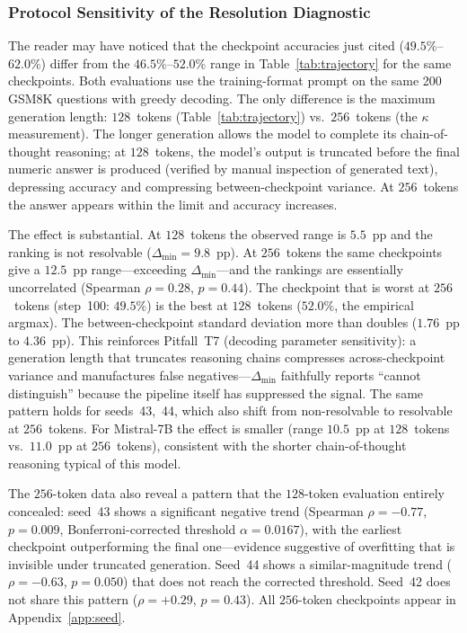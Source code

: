 \documentclass[pdflatex,sn-mathphys-ay,oneside]{sn-jnl}
\theoremstyle{thmstylethree}
\begin{document}
\subsubsection{Protocol Sensitivity of the Resolution Diagnostic}\label{sec:protocol_sensitivity}

The reader may have noticed that the checkpoint accuracies just cited ($49.5\%$--$62.0\%$) differ from the $46.5\%$--$52.0\%$ range in Table~\ref{tab:trajectory} for the same checkpoints. Both evaluations use the training-format prompt on the same 200 GSM8K questions with greedy decoding. The only difference is the maximum generation length: $128$~tokens (Table~\ref{tab:trajectory}) vs.\ $256$~tokens (the $\kappa$ measurement). The longer generation allows the model to complete its chain-of-thought reasoning; at $128$~tokens, the model's output is truncated before the final numeric answer is produced (verified by manual inspection of generated text), depressing accuracy and compressing between-checkpoint variance. At $256$~tokens the answer appears within the limit and accuracy increases.

The effect is substantial. At $128$~tokens the observed range is $5.5$~pp and the ranking is not resolvable ($\Delta_{\min}=9.8$~pp). At $256$~tokens the same checkpoints give a $12.5$~pp range---exceeding $\Delta_{\min}$---and the rankings are essentially uncorrelated (Spearman $\rho=0.28$, $p=0.44$). The checkpoint that is worst at $256$~tokens (step~100: $49.5\%$) is the best at $128$~tokens ($52.0\%$, the empirical argmax). The between-checkpoint standard deviation more than doubles ($1.76$~pp to $4.36$~pp). This reinforces Pitfall~T7 (decoding parameter sensitivity): a generation length that truncates reasoning chains compresses across-checkpoint variance and manufactures false negatives---$\Delta_{\min}$ faithfully reports ``cannot distinguish'' because the pipeline itself has suppressed the signal. The same pattern holds for seeds~43,~44, which also shift from non-resolvable to resolvable at $256$~tokens. For Mistral-7B the effect is smaller (range $10.5$~pp at $128$~tokens vs.\ $11.0$~pp at $256$~tokens), consistent with the shorter chain-of-thought reasoning typical of this model.

The $256$-token data also reveal a pattern that the $128$-token evaluation entirely concealed: seed~43 shows a significant negative trend (Spearman $\rho=-0.77$, $p=0.009$, Bonferroni-corrected threshold $\alpha=0.0167$), with the earliest checkpoint outperforming the final one---evidence suggestive of overfitting that is invisible under truncated generation. Seed~44 shows a similar-magnitude trend ($\rho=-0.63$, $p=0.050$) that does not reach the corrected threshold. Seed~42 does not share this pattern ($\rho=+0.29$, $p=0.43$). All $256$-token checkpoints appear in Appendix~\ref{app:seed}.
\end{document}
